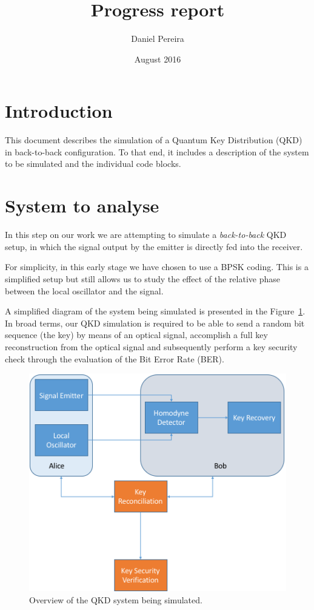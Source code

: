 \documentclass{article}
\begin{document}
\title{Progress report}
\date{August 2016}
\author{Daniel Pereira}
\maketitle

\section{Introduction}

This document describes the simulation of a Quantum Key Distribution (QKD) in back-to-back configuration. To that end, it includes a description of the system to be simulated and the individual code blocks.

\section{System to analyse}

In this step on our work we are attempting to simulate a \textit{back-to-back} QKD setup, in which the signal output by the emitter is directly fed into the receiver.
\par
For simplicity, in this early stage we have chosen to use a BPSK coding. This is a simplified setup but still allows us to study the effect of the relative phase between the local oscillator and the signal.
\par
A simplified diagram of the system being simulated is presented in the Figure~\ref{fig:physicalsystem}. In broad terms, our QKD simulation is required to be able to send a random bit sequence (the key) by means of an optical signal, accomplish a full key reconstruction from the optical signal and subsequently perform a key security check through the evaluation of the Bit Error Rate (BER).

\begin{figure}[h]
\centering
\includegraphics[width=.6\linewidth]{PhysicalSystem.png}
\caption{Overview of the QKD system being simulated.}
\label{fig:physicalsystem}
\end{figure}
\end{document}
